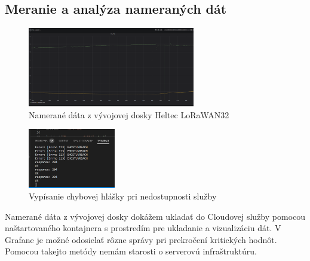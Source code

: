 
\newpage
\subsection{Meranie a analýza nameraných dát}
\begin{figure}[h!]
    \centering
    \includegraphics[width = 0.65\textwidth]{images/measurement.png}
    \caption{Namerané dáta z vývojovej dosky Heltec LoRaWAN32}
    \label{fig:measurement}
\end{figure}
\begin{figure}
    \centering
    \includegraphics[width = 0.34\textwidth]{images/fail.png}
    \caption{Vypísanie chybovej hlášky pri nedostupnosti služby}
    \label{fig:fail}
\end{figure}
Namerané dáta z vývojovej dosky dokážem ukladať do Cloudovej služby pomocou naštartovaného kontajnera s prostredím pre ukladanie a vizualizáciu dát. V Grafane je možné odosielať rôzne správy pri prekročení kritických hodnôt. Pomocou takejto metódy nemám starosti o serverovú infraštruktúru.
\vfill
\clearpage

